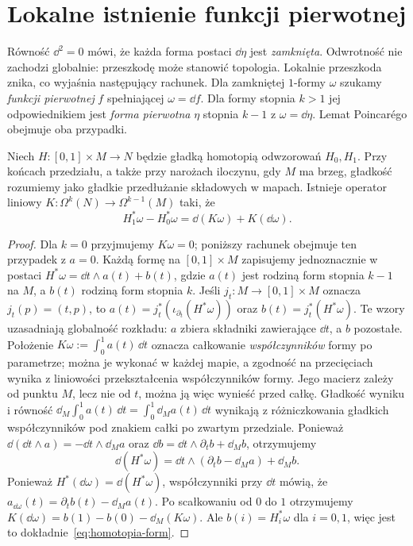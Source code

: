 \section{Lokalne istnienie funkcji pierwotnej}
\label{sec:formy-poincare}

Równość $\dd^2=0$ mówi, że każda forma postaci
$\dd\eta$ jest \emph{zamknięta}. Odwrotność nie zachodzi
globalnie: przeszkodę może stanowić topologia. Lokalnie
przeszkoda znika, co wyjaśnia następujący rachunek.
Dla zamkniętej $1$-formy $\omega$ szukamy \emph{funkcji
pierwotnej} $f$ spełniającej $\omega=\dd f$.
Dla formy stopnia $k>1$ jej odpowiednikiem jest
\emph{forma pierwotna} $\eta$ stopnia $k-1$ z
$\omega=\dd\eta$. Lemat Poincarégo obejmuje
oba przypadki.

\begin{lemat}
\label{lem:homotopia-form}
Niech $H:[0,1]\times M\to N$ będzie gładką homotopią
odwzorowań $H_0,H_1$. Przy końcach przedziału, a także
przy narożach iloczynu, gdy $M$ ma brzeg, gładkość
rozumiemy jako gładkie przedłużanie składowych w mapach. Istnieje operator liniowy
$K:\Omega^k(N)\to\Omega^{k-1}(M)$ taki, że
\begin{equation}\label{eq:homotopia-form}
 H_1^*\omega-H_0^*\omega
 =\dd(K\omega)+K(\dd\omega).
\end{equation}
\end{lemat}
\begin{proof}
Dla $k=0$ przyjmujemy $K\omega=0$; poniższy rachunek
obejmuje ten przypadek z $a=0$. Każdą formę na
$[0,1]\times M$ zapisujemy jednoznacznie
w postaci $H^*\omega=\dd t\wedge a(t)+b(t)$,
gdzie $a(t)$ jest rodziną form stopnia $k-1$ na $M$,
a $b(t)$ rodziną form stopnia $k$.
Jeśli $j_t:M\to[0,1]\times M$ oznacza $j_t(p)=(t,p)$, to
$a(t)=j_t^*(\iota_{\partial_t}(H^*\omega))$ oraz $b(t)=j_t^*(H^*\omega)$.
Te wzory uzasadniają globalność rozkładu: $a$ zbiera składniki
zawierające $\dd t$, a $b$ pozostałe.
Położenie
$K\omega:=\int_0^1 a(t)\,\dd t$ oznacza całkowanie
\emph{współczynników} formy po parametrze; można je
wykonać w każdej mapie, a zgodność na przecięciach
wynika z liniowości przekształcenia współczynników formy.
Jego macierz zależy od punktu $M$, lecz nie od $t$,
można ją więc wynieść przed całkę.
Gładkość wyniku i równość
$\dd_M\int_0^1a(t)\,\dd t=\int_0^1\dd_Ma(t)\,\dd t$
wynikają z różniczkowania gładkich współczynników pod znakiem
całki po zwartym przedziale.
Ponieważ $\dd(\dd t\wedge a)=-\dd t\wedge\dd_Ma$
oraz $\dd b=\dd t\wedge\partial_tb+\dd_Mb$, otrzymujemy
\[
 \dd(H^*\omega)
 =\dd t\wedge(\partial_tb-\dd_Ma)+\dd_Mb.
\]
Ponieważ $H^*(\dd\omega)=\dd(H^*\omega)$, współczynniki
przy $\dd t$ mówią, że
$a_{\dd\omega}(t)=\partial_tb(t)-\dd_Ma(t)$.
Po scałkowaniu od $0$ do $1$ otrzymujemy
$K(\dd\omega)=b(1)-b(0)-\dd_M(K\omega)$.
Ale $b(i)=H_i^*\omega$ dla $i=0,1$,
więc jest to dokładnie~\eqref{eq:homotopia-form}.
\end{proof}

